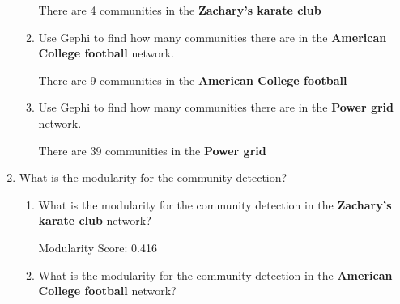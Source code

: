 \documentclass{amsart}
\theoremstyle{definition}
\theoremstyle{remark}
\numberwithin{equation}{section}
\begin{document}
\begin{enumerate}
\begin{enumerate}
        There are 4 communities in the \textbf{Zachary's karate club} \vspace{0.5 cm}

        \item Use Gephi to find how many communities there are in the \textbf{American College football} network. \vspace{0.5 cm}

        There are 9 communities in the \textbf{American College football} \vspace{0.5 cm}

        \item Use Gephi to find how many communities there are in the \textbf{Power grid} network. \vspace{0.5 cm}

        There are 39 communities in the \textbf{Power grid} \vspace{0.5 cm}

    \end{enumerate}
    \item What is the modularity for the community detection? \vspace{0.5 cm}
    \begin{enumerate}
        \item What is the modularity for the community detection in the \textbf{Zachary’s karate club} network? \vspace{0.5 cm}

        Modularity Score: 0.416

        \vspace{0.5 cm}

        \item What is the modularity for the community detection in the \textbf{American College football} network? \vspace{0.5 cm}


\end{enumerate}
\end{enumerate}
\end{document}
